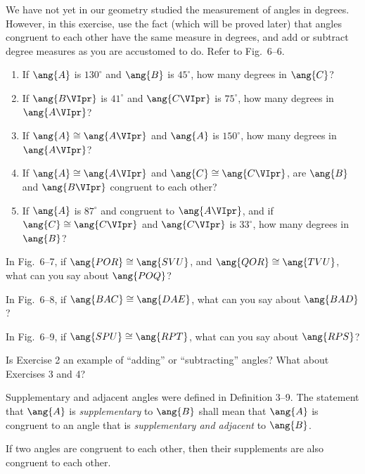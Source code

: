 \documentclass[11pt]{book}
\theoremstyle{bkplain}
\theoremstyle{XIplainnote}
\theoremstyle{bkplain}
\theoremstyle{bkplain}
\begin{document}
\begin{exercisecols}
\begin{exlist}
\item We have not yet in our geometry studied the measurement of angles in
  degrees. However, in this exercise, use the fact (which will be proved later)
  that angles congruent to each other have the same measure in degrees, and add
  or subtract degree measures as you are accustomed to do. Refer to Fig.~6--6.
  \begin{enumerate}[label=(\alph*), leftmargin=2.2em, itemsep=1pt, topsep=3pt]
  \item If $\ang{A}$ is $130^\circ$ and $\ang{B}$ is $45^\circ$, how many
    degrees in $\ang{C}$?
  \item If $\ang{B\VIpr}$ is $41^\circ$ and $\ang{C\VIpr}$ is $75^\circ$, how
    many degrees in $\ang{A\VIpr}$?
  \item If $\ang{A} \cong \ang{A\VIpr}$ and $\ang{A}$ is $150^\circ$, how many
    degrees in $\ang{A\VIpr}$?
  \item If $\ang{A} \cong \ang{A\VIpr}$ and $\ang{C} \cong \ang{C\VIpr}$, are
    $\ang{B}$ and $\ang{B\VIpr}$ congruent to each other?
  \item If $\ang{A}$ is $87^\circ$ and congruent to $\ang{A\VIpr}$, and if
    $\ang{C} \cong \ang{C\VIpr}$ and $\ang{C\VIpr}$ is $33^\circ$, how many
    degrees in $\ang{B}$?
  \end{enumerate}
\exfig{\FIGVISIX}
\item In Fig.~6--7, if $\ang{POR} \cong \ang{SVU}$, and $\ang{QOR} \cong
  \ang{TVU}$, what can you say about $\ang{POQ}$?
\exfig{\FIGVISEVEN}
\item In Fig.~6--8, if $\ang{BAC} \cong \ang{DAE}$, what can you say about
  $\ang{BAD}$?
\exfig{\FIGVIEIGHT}
\item In Fig.~6--9, if $\ang{SPU} \cong \ang{RPT}$, what can you say about
  $\ang{RPS}$?
\exfig{\FIGVININE}
\item Is Exercise 2 an example of ``adding'' or ``subtracting'' angles? What
  about Exercises 3 and 4?
\end{exlist}
\end{exercisecols}

Supplementary and adjacent angles were defined in Definition 3--9. The
statement that $\ang{A}$ is \emph{supplementary} to $\ang{B}$ shall mean that
$\ang{A}$ is congruent to an angle that is \emph{supplementary and adjacent} to
$\ang{B}$.

\begin{theorem}
If two angles are congruent to each other, then their supplements are also
congruent to each other.
\end{theorem}
\end{document}
